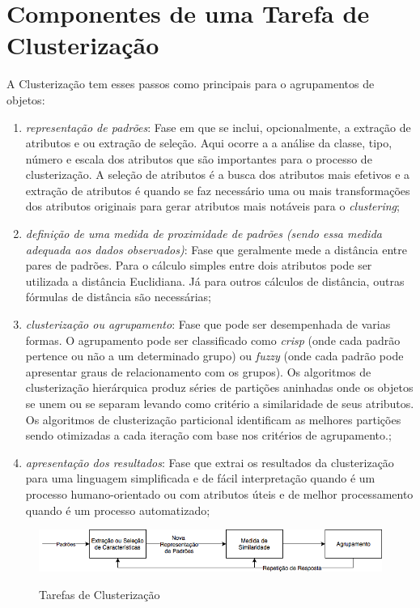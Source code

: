 \section{Componentes de uma Tarefa de Clusterização}

A Clusterização tem esses passos como principais para o agrupamentos de objetos:
\begin{enumerate}
\item \textit{representação de padrões}: Fase em que se inclui, opcionalmente, a extração de atributos e ou extração de seleção. Aqui ocorre a a análise da classe, tipo, número e escala dos atributos que são importantes para o processo de clusterização. A seleção de atributos é a busca dos atributos mais efetivos e a extração de atributos é quando se faz necessário uma ou mais transformações dos atributos originais para gerar atributos mais notáveis para o \textit{clustering};

\item \textit{definição de uma medida de proximidade de padrões (sendo essa medida adequada aos dados observados)}: Fase que geralmente mede a distância entre pares de padrões. Para o cálculo simples entre dois atributos pode ser utilizada a distância Euclidiana. Já para outros cálculos de distância, outras fórmulas de distância são necessárias;

\item \textit{clusterização ou agrupamento}: Fase que pode ser desempenhada de varias formas. O agrupamento pode ser classificado como \textit{crisp} (onde cada padrão pertence ou não a um determinado grupo) ou \textit{fuzzy} (onde cada padrão pode apresentar graus de relacionamento com os grupos). Os algoritmos de clusterização hierárquica produz séries de partições aninhadas onde os objetos se unem ou se separam levando como critério a similaridade de seus atributos. Os algoritmos de clusterização particional identificam as melhores partições sendo otimizadas a cada iteração com base nos critérios de agrupamento.; 

\item \textit{apresentação dos resultados}: Fase que extrai os resultados da clusterização para uma linguagem simplificada e de fácil interpretação quando é um processo humano-orientado ou com atributos úteis e de melhor processamento quando é um processo automatizado;
\end{enumerate}

\begin{figure}[!h]
\centering 
\caption{Tarefas de Clusterização}
\includegraphics[width = \textwidth]{imagens/fasesclusterizacao.png}
\label{fig:FASES-CLUSTERIZACAO}
\end{figure}

